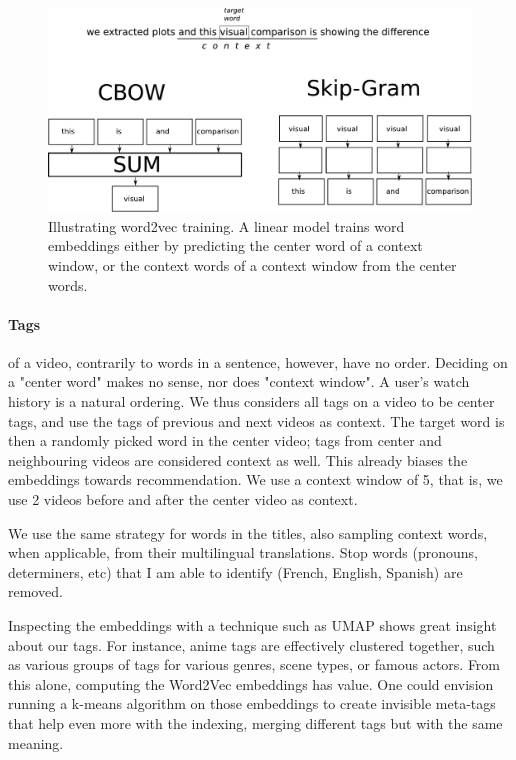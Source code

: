 \begin{figure}
    \centering
    \includegraphics[width=\columnwidth]{70-files/word2vec.pdf}
    \caption{Illustrating word2vec training. A linear model trains word embeddings either by predicting the center word of a context window, or the context words of a context window from the center words.}
    \label{fig:word2vec}
\end{figure}

\paragraph{Tags} of a video, contrarily to words in a sentence, however, have no order. Deciding on a "center word" makes no sense, nor does "context window". A user's watch history is a natural ordering. We thus considers all tags on a video to be center tags, and use the tags of previous and next videos as context. The target word is then a randomly picked word in the center video; tags from center and neighbouring videos are considered context as well. This already biases the embeddings towards recommendation. We use a context window of 5, that is, we use 2 videos before and after the center video as context.


We use the same strategy for words in the titles, also sampling context words, when applicable, from their multilingual translations. Stop words (pronouns, determiners, etc) that I am able to identify (French, English, Spanish) are removed.

Inspecting the embeddings with a technique such as \ac{UMAP} \citep{umap} shows great insight about our tags. For instance, anime tags are effectively clustered together, such as various groups of tags for various genres, scene types, or famous actors. From this alone, computing the Word2Vec embeddings has value. One could envision running a k-means algorithm on those embeddings to create invisible meta-tags that help even more with the indexing, merging different tags but with the same meaning.

